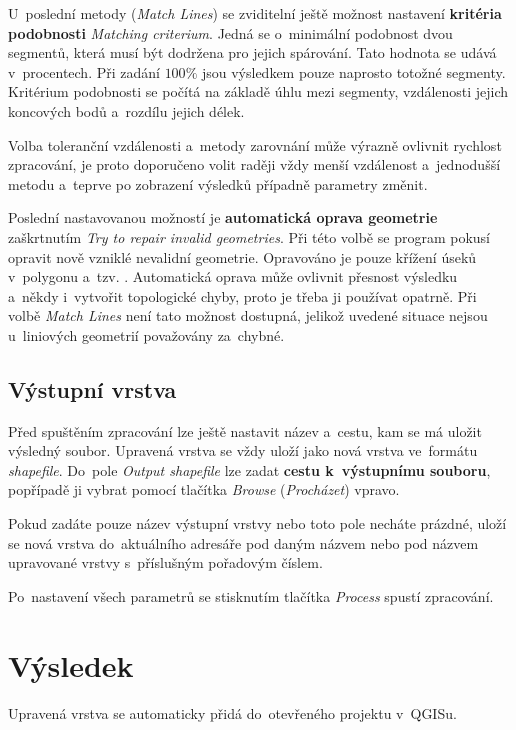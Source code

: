 U~poslední metody (\textit{Match Lines}) se zviditelní ještě možnost nastavení
\textbf{kritéria podobnosti} \textit{Matching criterium}. Jedná se o~minimální 
podobnost dvou segmentů, která musí být dodržena pro jejich spárování. 
Tato hodnota se udává v~procentech. Při zadání $100 \%$ jsou výsledkem pouze 
naprosto totožné segmenty. Kritérium podobnosti se počítá na základě úhlu mezi 
segmenty, vzdálenosti jejich koncových bodů a~rozdílu jejich délek. 

Volba toleranční vzdálenosti a~metody zarovnání může výrazně ovlivnit rychlost 
zpracování, je proto doporučeno volit raději vždy menší vzdálenost a~jednodušší
metodu a~teprve po zobrazení výsledků případně parametry změnit.

Poslední nastavovanou možností je \textbf{automatická oprava geometrie}
 zaškrtnutím \textit{Try to repair invalid geometries}. Při této volbě se 
program pokusí opravit nově vzniklé nevalidní geometrie. Opravováno je pouze 
křížení úseků v~polygonu a~tzv. . Automa\-tická oprava  
může ovlivnit přesnost výsledku a~někdy i~vytvořit topologické chyby, proto 
je třeba ji používat opatrně. Při volbě \textit{Match Lines} není tato možnost
dostupná, jelikož uvedené situace nejsou u~liniových geometrií považovány
za~chybné.

\subsection{Výstupní vrstva}

Před spuštěním zpracování lze ještě nastavit název a~cestu, kam se má uložit
vý\-sledný soubor. Upravená vrstva se vždy uloží jako nová vrstva ve~formátu 
\textit{shapefile}. Do~pole \textit{Output shapefile} lze zadat \textbf{cestu 
k~výstupnímu souboru}, popřípadě ji vybrat pomocí tlačítka \textit{Browse} 
(\textit{Procházet}) vpravo. 

Pokud zadáte pouze název výstupní vrstvy nebo toto pole necháte prázdné, 
uloží se nová vrstva do~aktuálního adresáře pod daným názvem nebo pod názvem
upravované vrstvy s~příslušným pořadovým číslem. 

Po~nastavení všech parametrů se stisknutím tlačítka \textit{Process} 
spustí zpracování. 

\section{Výsledek}
\label{prirucka-vysledek}

Upravená vrstva se automaticky přidá do~otevřeného projektu v~QGISu.

